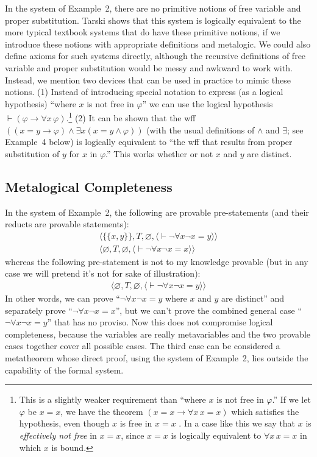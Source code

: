 In the system of Example~2, there are no primitive notions of free variable
and proper substitution.  Tarski \cite{Tarski1965} shows that this system is
logically equivalent to the more typical textbook systems that do have these
primitive notions, if we introduce these notions with appropriate definitions
and metalogic.  We could also define axioms for such systems directly,
although the recursive definitions of free variable and proper substitution
would be messy and awkward to work with.  Instead, we mention two devices that
can be used in practice to mimic these notions.  (1) Instead of introducing
special notation to express (as a logical hypothesis) ``where $x$ is not free
in $\varphi$'' we can use the logical hypothesis $\vdash(\varphi\to\forall
x\,\varphi)$.\label{effectivelybound}\footnote{This is a slightly weaker requirement than ``where $x$ is
not free in $\varphi$.''  If we let $\varphi$ be $x=x$, we have the theorem
$(x=x\to\forall x\,x=x)$ which satisfies the hypothesis, even though $x$ is
free in $x=x$ .  In a case like this we say that $x$ is {\em effectively not
free} in $x=x$, since $x=x$ is logically
equivalent to $\forall x\,x=x$ in which $x$ is bound.} (2) It can be shown
that the wff $((x=y\to\varphi)\wedge\exists x(x=y\wedge\varphi))$ (with the
usual definitions of $\wedge$ and $\exists$; see Example~4 below) is logically
equivalent to ``the wff that results from proper substitution of $y$ for $x$
in $\varphi$.''  This works whether or not $x$ and $y$ are distinct.

\subsection{Metalogical Completeness}

In the system of Example~2, the
following are provable pre-statements (and their reducts are
provable statements):
\begin{eqnarray*}
      & \langle\{\{x,y\}\},T,\varnothing,
               \langle \vdash\lnot\forall x\lnot x=y
               \rangle\rangle & \\
     &  \langle\varnothing,T,\varnothing,
               \langle \vdash\lnot\forall x\lnot x=x
               \rangle\rangle &
\end{eqnarray*}
whereas the following pre-statement is not to my knowledge provable (but
in any case we will pretend it's not for sake of illustration):
\begin{eqnarray*}
     &  \langle\varnothing,T,\varnothing,
               \langle \vdash\lnot\forall x\lnot x=y
               \rangle\rangle &
\end{eqnarray*}
In other words, we can prove ``$\lnot\forall x\lnot x=y$ where $x$ and $y$ are
distinct'' and separately prove ``$\lnot\forall x\lnot x=x$'', but we can't
prove the combined general case ``$\lnot\forall x\lnot x=y$'' that has no
proviso.  Now this does not compromise logical completeness, because the
variables are really metavariables and the two provable cases together cover
all possible cases.  The third case can be considered a metatheorem whose
direct proof, using the system of Example~2, lies outside the capability of the
formal system.

